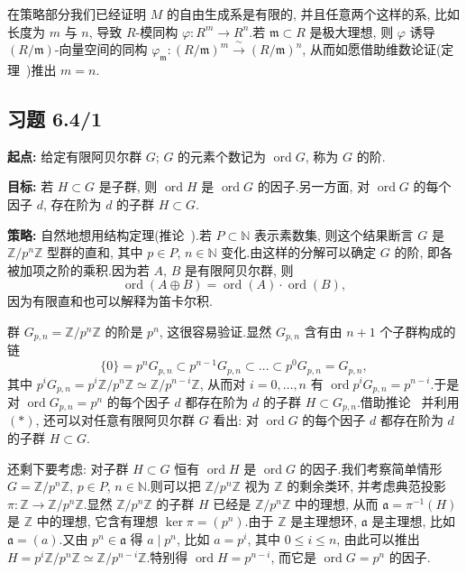 在策略部分我们已经证明 $M$ 的自由生成系是有限的, 并且任意两个这样的系, 比如长度为 $m$ 与 $n$, 导致 $R$-模同构 $\varphi \colon R^m \longrightarrow R^n$.若 $\mathfrak{m} \subset R$ 是极大理想, 则 $\varphi$ 诱导 $(R/\mathfrak{m})$-向量空间的同构 $\varphi_{\mathfrak{m}} \colon (R/\mathfrak{m})^m \xrightarrow{\ \sim\ } (R/\mathfrak{m})^n$, 从而如愿借助维数论证(定理~)推出 $m = n$.

\subsection*{习题 6.4/1}

\noindent\textbf{起点:} 给定有限阿贝尔群 $G$; $G$ 的元素个数记为 $\operatorname{ord} G$, 称为 $G$ 的阶.

\noindent\textbf{目标:} 若 $H \subset G$ 是子群, 则 $\operatorname{ord} H$ 是 $\operatorname{ord} G$ 的因子.另一方面, 对 $\operatorname{ord} G$ 的每个因子 $d$, 存在阶为 $d$ 的子群 $H \subset G$.

\noindent\textbf{策略:} 自然地想用结构定理(推论~).若 $P \subset \mathbb{N}$ 表示素数集, 则这个结果断言 $G$ 是 $\mathbb{Z}/p^n \mathbb{Z}$ 型群的直和, 其中 $p \in P$, $n \in \mathbb{N}$ 变化.由这样的分解可以确定 $G$ 的阶, 即各被加项之阶的乘积.因为若 $A$, $B$ 是有限阿贝尔群, 则
\begin{equation}
\operatorname{ord}(A \oplus B) = \operatorname{ord}(A) \cdot \operatorname{ord}(B), \tag{$*$}
\end{equation}
因为有限直和也可以解释为笛卡尔积.

群 $G_{p, n} = \mathbb{Z}/p^n \mathbb{Z}$ 的阶是 $p^n$, 这很容易验证.显然 $G_{p, n}$ 含有由 $n + 1$ 个子群构成的链
\[
\{0\} = p^n G_{p, n} \subset p^{n - 1} G_{p, n} \subset \ldots \subset p^0 G_{p, n} = G_{p, n},
\]
其中
$p^i G_{p, n} = p^i \mathbb{Z}/p^n \mathbb{Z} \simeq \mathbb{Z}/p^{n - i} \mathbb{Z}$,
从而对 $i = 0, \ldots, n$ 有 $\operatorname{ord} p^i G_{p, n} = p^{n - i}$.于是对 $\operatorname{ord} G_{p, n} = p^n$ 的每个因子 $d$ 都存在阶为 $d$ 的子群 $H \subset G_{p, n}$.借助推论~ 并利用 $(*)$, 还可以对任意有限阿贝尔群 $G$ 看出: 对 $\operatorname{ord} G$ 的每个因子 $d$ 都存在阶为 $d$ 的子群 $H \subset G$.

还剩下要考虑: 对子群 $H \subset G$ 恒有 $\operatorname{ord} H$ 是 $\operatorname{ord} G$ 的因子.我们考察简单情形 $G = \mathbb{Z}/p^n \mathbb{Z}$, $p \in P$, $n \in \mathbb{N}$.则可以把 $\mathbb{Z}/p^n \mathbb{Z}$ 视为 $\mathbb{Z}$ 的剩余类环, 并考虑典范投影 $\pi \colon \mathbb{Z} \longrightarrow \mathbb{Z}/p^n \mathbb{Z}$.显然 $\mathbb{Z}/p^n \mathbb{Z}$ 的子群 $H$ 已经是 $\mathbb{Z}/p^n \mathbb{Z}$ 中的理想, 从而 $\mathfrak{a} = \pi^{-1}(H)$ 是 $\mathbb{Z}$ 中的理想, 它含有理想 $\ker \pi = (p^n)$.由于 $\mathbb{Z}$ 是主理想环, $\mathfrak{a}$ 是主理想, 比如 $\mathfrak{a} = (a)$.又由 $p^n \in \mathfrak{a}$ 得 $a \mid p^n$, 比如 $a = p^i$, 其中 $0 \leq i \leq n$, 由此可以推出 $H = p^i \mathbb{Z}/p^n \mathbb{Z} \simeq \mathbb{Z}/p^{n - i} \mathbb{Z}$.特别得 $\operatorname{ord} H = p^{n - i}$, 而它是 $\operatorname{ord} G = p^n$ 的因子.

